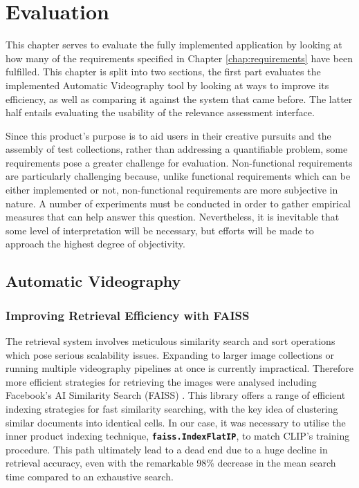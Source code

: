 \documentclass{l4proj}
\begin{document}




\chapter{Evaluation} 
This chapter serves to evaluate the fully implemented application by looking at how many of the requirements specified in Chapter \ref{chap:requirements} have been fulfilled. This chapter is split into two sections, the first part evaluates the implemented Automatic Videography tool by looking at ways to improve its efficiency, as well as comparing it against the system that came before. The latter half entails evaluating the usability of the relevance assessment interface.

Since this product's purpose is to aid users in their creative pursuits and the assembly of test collections, rather than addressing a quantifiable problem, some requirements pose a greater challenge for evaluation. Non-functional requirements are particularly challenging because, unlike functional requirements which can be either implemented or not, non-functional requirements are more subjective in nature. A number of experiments must be conducted in order to gather empirical measures that can help answer this question. Nevertheless, it is inevitable that some level of interpretation will be necessary, but efforts will be made to approach the highest degree of objectivity.

\section{Automatic Videography}
\subsection{Improving Retrieval Efficiency with FAISS}
The retrieval system involves meticulous similarity search and sort operations which pose serious scalability issues. Expanding to larger image collections or running multiple videography pipelines at once is currently impractical. Therefore more efficient strategies for retrieving the images were analysed including Facebook's AI Similarity Search (FAISS) \citep{johnson2019faiss}. This library offers a range of efficient indexing strategies for fast similarity searching, with the key idea of clustering similar documents into identical cells. In our case, it was necessary to utilise the inner product indexing technique, \textbf{\lstinline|faiss.IndexFlatIP|}, to match CLIP's training procedure. This path ultimately lead to a dead end due to a huge decline in retrieval accuracy, even with the remarkable 98\% decrease in the mean search time compared to an exhaustive search. 
\end{document}
